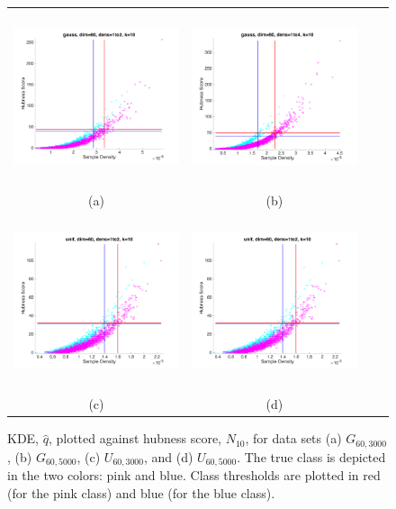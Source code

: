 \documentclass[graybox]{svmult}
\begin{document}
\begin{figure}
\centering
    \begin{tabular}{cccc}
        \includegraphics[width=2.5in,height=2in]{../fig/gauss-dim60-1to2-k10-LocKDELocHubs.png} &
        \includegraphics[width=2.5in,height=2in]{../fig/gauss-dim60-1to4-k10-LocKDELocHubs.png} \\
        {\scriptsize (a)} &  {\scriptsize (b)} \\
        \includegraphics[width=2.5in,height=2in]{../fig/unif-dim60-1to2-k10-LocKDELocHubs.png}&
        \includegraphics[width=2.5in,height=2in]{../fig/unif-dim60-1to2-k10-LocKDELocHubs.png}\\
        {\scriptsize (c)} &  {\scriptsize (d)} 
      \end{tabular}
      \caption{KDE, $\hat{q}$, plotted against hubness score, $N_{10}$, for data sets (a) $G_{60,3000}$, (b) $G_{60,5000}$, (c) $U_{60,3000}$, and (d) $U_{60,5000}$. The true class is depicted in the two colors: pink and blue. Class thresholds are plotted in red (for the pink class) and blue (for the blue class).}\label{fig:LocDensHubs}
\end{figure}
 
\end{document}
